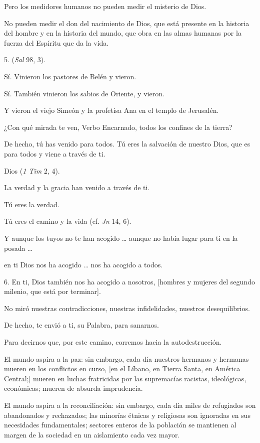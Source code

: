 \begin{body}
\begin{body}
		Pero los medidores humanos no pueden medir el misterio de Dios.

		No pueden medir el don del nacimiento de Dios, que está presente en la historia del hombre y en la historia del mundo, que obra en las almas humanas por la fuerza del Espíritu que da la vida.

		5.  (\emph{Sal} 98, 3).

		Sí. Vinieron los pastores de Belén y vieron.

		Sí. También vinieron los sabios de Oriente, y vieron.

		Y vieron el viejo Simeón y la profetisa Ana en el templo de Jerusalén.

		¿Con qué mirada te ven, Verbo Encarnado, todos los confines de la tierra?

		De hecho, tú has venido para todos. Tú eres la salvación de nuestro Dios, que es para todos y viene a través de ti.

		Dios  (\emph{1 Tim} 2, 4).

		La verdad y la gracia han venido a través de ti.

		Tú eres la verdad.

		Tú eres el camino y la vida (cf. \emph{Jn} 14, 6).

		Y aunque los tuyos no te han acogido \ldots{} aunque no había lugar para ti en la posada \ldots{}

		en ti Dios nos ha acogido \ldots{} nos ha acogido a todos.

		6. En ti, Dios también nos ha acogido a nosotros, {[}hombres y mujeres del segundo milenio, que está por terminar{]}.

		No miró nuestras contradicciones, nuestras infidelidades, nuestros desequilibrios.

		De hecho, te envió a ti, su Palabra, para sanarnos.

		Para decirnos que, por este camino, corremos hacia la autodestrucción.

		El mundo aspira a la paz: sin embargo, cada día nuestros hermanos y hermanas mueren en los conflictos en curso, {[}en el Líbano, en Tierra Santa, en América Central;{]} mueren en luchas fratricidas por las supremacías racistas, ideológicas, económicas; mueren de absurda imprudencia.

		El mundo aspira a la reconciliación: sin embargo, cada día miles de refugiados son abandonados y rechazados; las minorías étnicas y religiosas son ignoradas en sus necesidades fundamentales; sectores enteros de la población se mantienen al margen de la sociedad en un aislamiento cada vez mayor.


\end{body}
\end{body}
